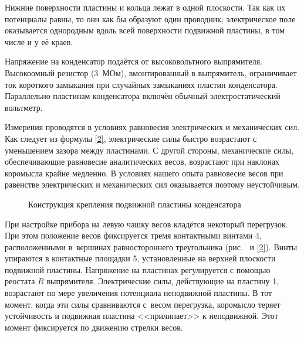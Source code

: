 Нижние поверхности пластины и кольца лежат в одной плоскости. Так как их
потенциалы равны, то они как бы образуют один
проводник; электрическое поле оказывается однородным вдоль всей поверхности
подвижной пластины, в том числе и у её краев.

Напряжение на конденсатор подаётся от высоковольтного выпрямителя. Высокоомный
резистор (3~МОм), вмонтированный в
выпрямитель, ограничивает ток короткого замыкания при случайных замыканиях
пластин конденсатора. Параллельно пластинам
конденсатора включён обычный электростатический вольтметр.

Измерения проводятся в условиях равновесия электрических и механических сил. Как
следует из формулы \eqref{2},
электрические силы быстро возрастают с уменьшением зазора между пластинами. С
другой стороны, механические силы,
обеспечивающие равновесие аналитических весов, возрастают при наклонах коромысла
крайне медленно. В условиях нашего опыта равновесие весов при равенстве
электрических и механических сил оказывается поэтому неустойчивым.

\begin{wrapfigure}{r}{0.4\textwidth}
	\caption{Конструкция крепления подвижной пластины конденсатора}
\end{wrapfigure}

При настройке прибора на левую чашку весов кладётся некоторый перегрузок. При
этом положение весов фиксируется тремя
контактными винтами 4, расположенными в~вершинах равностороннего треугольника
(рис.~ и \eqref{2}). Винты упираются в
контактные площадки 5, установленные на верхней плоскости подвижной пластины.
Напряжение на пластинах регулируется с
помощью реостата $R$ выпрямителя. Электрические силы, действующие на пластину 1,
возрастают по мере увеличения
потенциала неподвижной пластины. В тот момент, когда эти силы сравниваются
с~весом перегрузка, коромысло теряет
устойчивость и подвижная пластина <<прилипает>> к неподвижной. Этот момент
фиксируется по движению стрелки весов.

